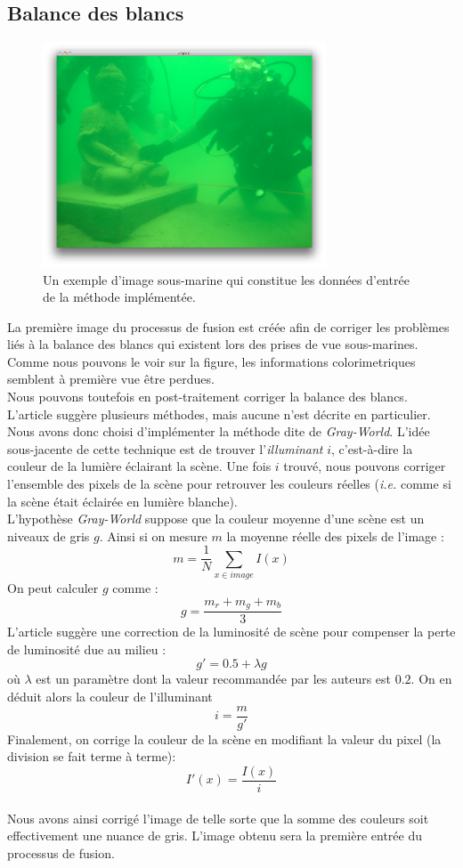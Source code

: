 \documentclass[twoside]{article}
\begin{document}
\subsection{Balance des blancs}

\begin{figure}[H]
  \centering
  \includegraphics[width=0.75\textwidth]{Support/input.png}
  \caption{Un exemple d'image sous-marine qui constitue les données d'entrée de la méthode implémentée.}
\end{figure}

La première image du processus de fusion est créée afin de corriger les problèmes liés à la balance des blancs qui existent lors des prises de vue sous-marines. Comme nous pouvons le voir sur la figure, les informations colorimetriques semblent à première vue être perdues.\\
Nous pouvons toutefois en post-traitement corriger la balance des blancs. L'article suggère plusieurs méthodes, mais aucune n'est décrite en particulier. Nous avons donc choisi d'implémenter la méthode dite de \emph{Gray-World}. L'idée sous-jacente de cette technique est de trouver l'\emph{illuminant} $i$, c'est-à-dire la couleur de la lumière éclairant la scène. Une fois $i$ trouvé, nous pouvons corriger l'ensemble des pixels de la scène pour retrouver les couleurs réelles (\emph{i.e.} comme si la scène était éclairée en lumière blanche).\\
L'hypothèse \emph{Gray-World} suppose que la couleur moyenne d'une scène est un niveaux de gris $g$. Ainsi si on mesure $m$ la moyenne réelle des pixels de l'image : $$m = \frac{1}{N}\sum_{x \in image}I(x)$$ On peut calculer $g$ comme : $$g = \frac{m_r + m_g + m_b}{3}$$ L'article suggère une correction de la luminosité de scène pour compenser la perte de luminosité due au milieu : $$g' = 0.5 + \lambda g$$ où $\lambda$ est un paramètre dont la valeur recommandée par les auteurs est $0.2$. On en déduit alors la couleur de l'illuminant $$ i = \frac{m}{g'}$$ Finalement, on corrige la couleur de la scène en modifiant la valeur du pixel (la division se fait terme à terme): $$I'(x) = \frac{I(x)}{i}$$\\
Nous avons ainsi corrigé l'image de telle sorte que la somme des couleurs soit effectivement une nuance de gris. L'image obtenu sera la première entrée du processus de fusion.
\end{document}

